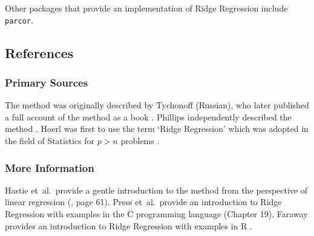 Other packages that provide an implementation of Ridge Regression include \texttt{parcor}.

\subsection{References}

\subsubsection{Primary Sources}
The method was originally described by Tychonoff \cite{Tikhonov1943, Tikhonov1963} (Russian), who later published a full account of the method as a book \cite{Tikhonov1977}.
Phillips independently described the method \cite{Phillips1962}. Hoerl was first to use the term `Ridge Regression' which was adopted in the field of Statistics for $p>n$ problems \cite{Hoerl1962, Hoerl1970, Hoerl1970a}.

\subsubsection{More Information}
Hastie et~al.\ provide a gentle introduction to the method from the perspective of linear regression (\cite{Hastie2009}, page 61).
Press et~al.\ provide an introduction to Ridge Regression with examples in the C programming language \cite{Press2007} (Chapter 19).
Faraway provides an introduction to Ridge Regression with examples in R \cite{Faraway2002}.

